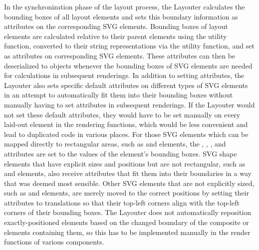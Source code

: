 In the synchronization phase of the layout process, the Layouter
calculates the bounding boxes of all layout elements and sets this
boundary information as attributes on the corresponding SVG elements.
Bounding boxes of layout elements are calculated relative to their
parent elements using the  utility
function, converted to their string representations via the
 utility function, and set as 
attributes on corresponding SVG elements.  These 
attributes can then be deserialized to  objects whenever
the bounding boxes of SVG elements are needed for calculations in
subsequent renderings. In addition to setting 
attributes, the Layouter also sets specific default attributes on
different types of SVG elements in an attempt to automatically fit
them into their bounding boxes without manually having to set
attributes in subsequent renderings.  If the Layouter would not set
these default attributes, they would have to be set manually on every
laid-out element in the rendering functions, which would be less
convenient and lead to duplicated code in various places. For those
SVG elements which can be mapped directly to rectangular areas, such
as  and  elements, the , ,
, and  attributes are set to the values of
the element's bounding boxes. SVG shape elements that have explicit
sizes and positions but are not rectangular, such as 
and  elements, also receive attributes that fit them into
their boundaries in a way that was deemed most sensible. Other SVG
elements that are not explicitly sized, such as  and
 elements, are merely moved to the correct positions by
setting their  attributes to translations so that
their top-left corners align with the top-left corners of their
bounding boxes. The Layouter does not automatically reposition
exactly-positioned elements based on the changed boundary of the
composite  or  elements containing them, so this
has to be implemented manually in the render functions of various
components.

